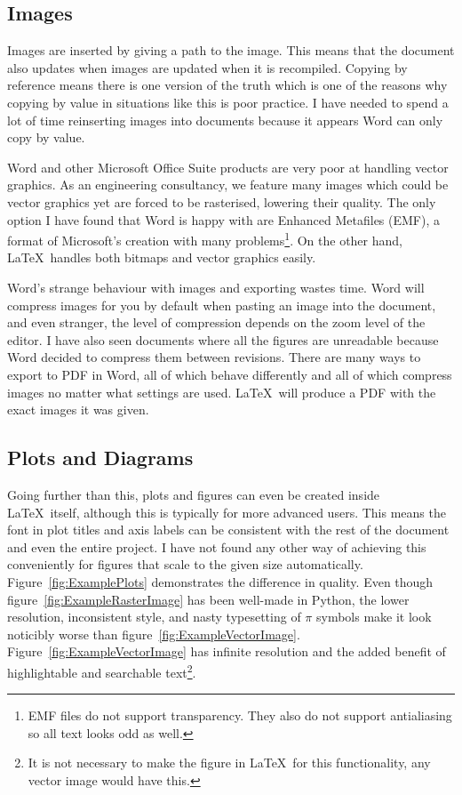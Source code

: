 \subsection{Images}
\label{subsec:Images}

Images are inserted by giving a path to the image. This means that the document also updates when images are updated when it is recompiled. Copying by reference means there is one version of the truth which is one of the reasons why copying by value in situations like this is poor practice. I have needed to spend a lot of time reinserting images into documents because it appears Word can only copy by value.

Word and other Microsoft Office Suite products are very poor at handling vector graphics. As an engineering consultancy, we feature many images which could be vector graphics yet are forced to be rasterised, lowering their quality. The only option I have found that Word is happy with are Enhanced Metafiles (EMF), a format of Microsoft's creation with many problems\footnote{EMF files do not support transparency. They also do not support antialiasing so all text looks odd as well.}. On the other hand, \LaTeX\ handles both bitmaps and vector graphics easily.

Word's strange behaviour with images and exporting wastes time. Word will compress images for you by default when pasting an image into the document, and even stranger, the level of compression depends on the zoom level of the editor. I have also seen documents where all the figures are unreadable because Word decided to compress them between revisions. There are many ways to export to PDF in Word, all of which behave differently and all of which compress images no matter what settings are used. \LaTeX\ will produce a PDF with the exact images it was given.

\subsection{Plots and Diagrams}
\label{subsec:PlotsAndDiagrams}

Going further than this, plots and figures can even be created inside \LaTeX\ itself, although this is typically for more advanced users. This means the font in plot titles and axis labels can be consistent with the rest of the document and even the entire project. I have not found any other way of achieving this conveniently for figures that scale to the given size automatically. Figure~\ref{fig:ExamplePlots} demonstrates the difference in quality. Even though figure~\ref{fig:ExampleRasterImage} has been well-made in Python, the lower resolution, inconsistent style, and nasty typesetting of $\pi$ symbols make it look noticibly worse than figure~\ref{fig:ExampleVectorImage}. Figure~\ref{fig:ExampleVectorImage} has infinite resolution and the added benefit of highlightable and searchable text\footnote{It is not necessary to make the figure in \LaTeX\ for this functionality, any vector image would have this.}.

